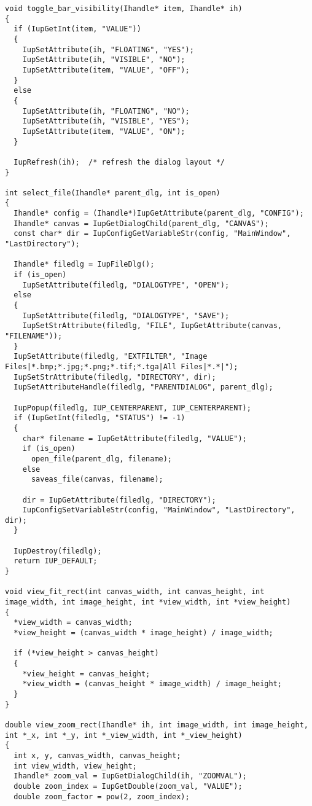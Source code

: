 \documentclass{ctexart}
\begin{document}
\begin{lstlisting}
void toggle_bar_visibility(Ihandle* item, Ihandle* ih)
{
  if (IupGetInt(item, "VALUE"))
  {
    IupSetAttribute(ih, "FLOATING", "YES");
    IupSetAttribute(ih, "VISIBLE", "NO");
    IupSetAttribute(item, "VALUE", "OFF");
  }
  else
  {
    IupSetAttribute(ih, "FLOATING", "NO");
    IupSetAttribute(ih, "VISIBLE", "YES");
    IupSetAttribute(item, "VALUE", "ON");
  }

  IupRefresh(ih);  /* refresh the dialog layout */
}

int select_file(Ihandle* parent_dlg, int is_open)
{
  Ihandle* config = (Ihandle*)IupGetAttribute(parent_dlg, "CONFIG");
  Ihandle* canvas = IupGetDialogChild(parent_dlg, "CANVAS");
  const char* dir = IupConfigGetVariableStr(config, "MainWindow", "LastDirectory");

  Ihandle* filedlg = IupFileDlg();
  if (is_open)
    IupSetAttribute(filedlg, "DIALOGTYPE", "OPEN");
  else
  {
    IupSetAttribute(filedlg, "DIALOGTYPE", "SAVE");
    IupSetStrAttribute(filedlg, "FILE", IupGetAttribute(canvas, "FILENAME"));
  }
  IupSetAttribute(filedlg, "EXTFILTER", "Image Files|*.bmp;*.jpg;*.png;*.tif;*.tga|All Files|*.*|");
  IupSetStrAttribute(filedlg, "DIRECTORY", dir);
  IupSetAttributeHandle(filedlg, "PARENTDIALOG", parent_dlg);

  IupPopup(filedlg, IUP_CENTERPARENT, IUP_CENTERPARENT);
  if (IupGetInt(filedlg, "STATUS") != -1)
  {
    char* filename = IupGetAttribute(filedlg, "VALUE");
    if (is_open)
      open_file(parent_dlg, filename);
    else
      saveas_file(canvas, filename);

    dir = IupGetAttribute(filedlg, "DIRECTORY");
    IupConfigSetVariableStr(config, "MainWindow", "LastDirectory", dir);
  }

  IupDestroy(filedlg);
  return IUP_DEFAULT;
}

void view_fit_rect(int canvas_width, int canvas_height, int image_width, int image_height, int *view_width, int *view_height)
{
  *view_width = canvas_width;
  *view_height = (canvas_width * image_height) / image_width;

  if (*view_height > canvas_height)
  {
    *view_height = canvas_height;
    *view_width = (canvas_height * image_width) / image_height;
  }
}

double view_zoom_rect(Ihandle* ih, int image_width, int image_height, int *_x, int *_y, int *_view_width, int *_view_height)
{
  int x, y, canvas_width, canvas_height;
  int view_width, view_height;
  Ihandle* zoom_val = IupGetDialogChild(ih, "ZOOMVAL");
  double zoom_index = IupGetDouble(zoom_val, "VALUE");
  double zoom_factor = pow(2, zoom_index);


\end{lstlisting}
\end{document}
